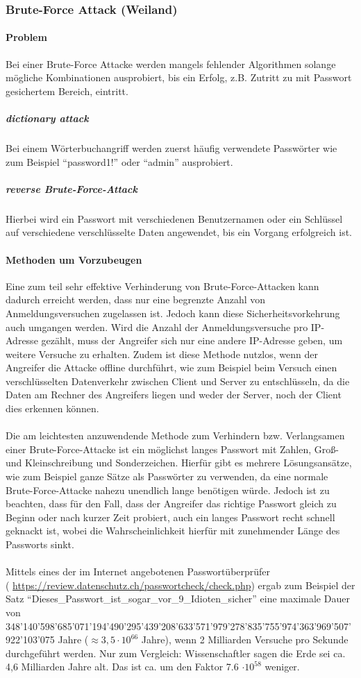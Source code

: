 \subsubsection{Brute-Force Attack (Weiland)}
\paragraph{Problem}
Bei einer Brute-Force Attacke werden mangels fehlender Algorithmen solange mögliche Kombinationen ausprobiert, bis ein Erfolg, z.B. Zutritt zu mit Passwort gesichertem Bereich, eintritt.
\subparagraph{dictionary attack}
Bei einem Wörterbuchangriff werden zuerst häufig verwendete Passwörter wie zum Beispiel \enquote{password1!} oder \enquote{admin} ausprobiert. 
\subparagraph{reverse Brute-Force-Attack}
Hierbei wird ein Passwort mit verschiedenen Benutzernamen oder ein Schlüssel auf verschiedene verschlüsselte Daten angewendet, bis ein Vorgang erfolgreich ist.
\paragraph{Methoden um Vorzubeugen}
Eine zum teil sehr effektive Verhinderung von Brute-Force-Attacken kann dadurch erreicht werden, dass nur eine begrenzte Anzahl von Anmeldungsversuchen  zugelassen ist. Jedoch kann diese Sicherheitsvorkehrung auch umgangen werden. Wird die Anzahl der Anmeldungsversuche pro IP-Adresse gezählt, muss der Angreifer sich nur eine andere IP-Adresse geben, um weitere Versuche zu erhalten. Zudem ist diese Methode nutzlos, wenn der Angreifer die Attacke offline durchführt, wie zum Beispiel beim Versuch einen verschlüsselten Datenverkehr zwischen Client und Server zu entschlüsseln, da die Daten am Rechner des Angreifers liegen und weder der Server, noch der Client dies erkennen können. \\\\
Die am leichtesten anzuwendende Methode zum Verhindern bzw. Verlangsamen einer Brute-Force-Attacke ist ein möglichst langes Passwort mit Zahlen, Groß- und Kleinschreibung und Sonderzeichen. Hierfür gibt es mehrere Lösungsansätze, wie zum Beispiel ganze Sätze als Passwörter zu verwenden, da eine normale Brute-Force-Attacke nahezu unendlich lange benötigen würde. Jedoch ist zu beachten, dass für den Fall, dass der Angreifer das richtige Passwort gleich zu Beginn oder nach kurzer Zeit probiert, auch ein langes Passwort recht schnell geknackt ist, wobei die Wahrscheinlichkeit hierfür mit zunehmender Länge des Passworts sinkt.\\
\\
Mittels eines der im Internet angebotenen Passwortüberprüfer \\( \href{https://review.datenschutz.ch/passwortcheck/check.php}{https://review.datenschutz.ch/passwortcheck/check.php}) ergab zum Beispiel der Satz \enquote{Dieses\_Passwort\_ist\_sogar\_vor\_9\_Idioten\_sicher\!} eine maximale Dauer von\\ 348'140'598'685'071'194'490'295'439'208'633'571'979'278'835'755'974'363'969'507'922'103'075 Jahre ($\approx 3,5 \cdot 10^{66}$ Jahre), wenn 2 Milliarden Versuche pro Sekunde durchgeführt werden. Nur zum Vergleich: Wissenschaftler sagen die Erde sei ca. 4,6 Milliarden Jahre alt. Das ist ca. um den Faktor 7.6 $\cdot 10^{58}$ weniger.
